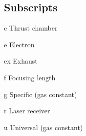 \begin{multicols*}{2}
    \section*{Subscripts}
    \begin{nomlist}
        \item[c]                Thrust chamber
        \item[e]                Electron
        \item[ex]               Exhaust
        \item[f]                Focusing length
        \item[g]                Specific (gas constant)
        \item[r]                Laser receiver
        \item[u]                Universal (gas constant)
    \end{nomlist}


\end{multicols*}